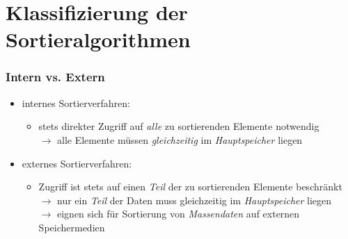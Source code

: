 \documentclass{lehramt-informatik-haupt}
\begin{document}

\chapter{Klassifizierung der Sortieralgorithmen}

%

\subsection{Intern vs. Extern}

\cite[Seite 34]{aud:fs:tafeluebung-11}

\begin{itemize}

%

\item internes Sortierverfahren:

\begin{itemize}
\item stets direkter Zugriff auf \emph{alle} zu sortierenden Elemente
notwendig\\
%
$\rightarrow$ alle Elemente müssen \emph{gleichzeitig} im
\emph{Hauptspeicher} liegen
\end{itemize}

%

\item externes Sortierverfahren:

\begin{itemize}
\item Zugriff ist stets auf einen \emph{Teil} der zu sortierenden
Elemente beschränkt\\
%
$\rightarrow$ nur ein \emph{Teil} der Daten muss gleichzeitig im
\emph{Hauptspeicher} liegen\\
%
$\rightarrow$ eignen sich für Sortierung von \emph{Massendaten} auf
externen Speichermedien
\end{itemize}

\end{itemize}

%
\end{document}
